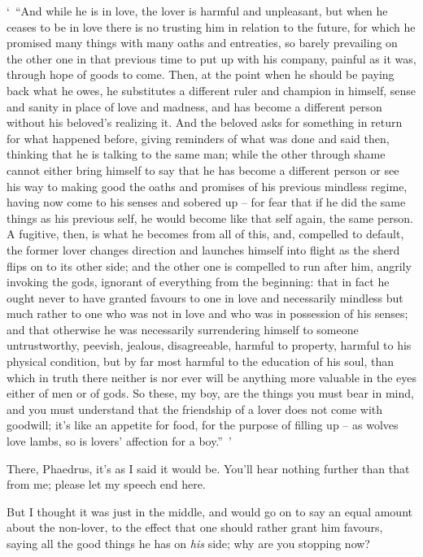 ‘~“And while he is in love, the lover is harmful and unpleasant, but
when he ceases to be in love there is no trusting him in relation to the
future, for which he promised many things with  many oaths and
entreaties, so barely prevailing on the other  one in that
previous time to put up with his company, painful as it was, through
hope of goods to come. Then, at the point when he should be paying back
what he owes, he substitutes a different ruler and champion in himself,
sense and sanity in place of love and madness, and has become a
different person without his beloved's realizing it. And the beloved
asks for  something in return for what happened
before, giving reminders
of what was done and said then, thinking that he is talking to the same
man; while the other through shame cannot either bring himself to say
that he has become a different person or see his way to making good the
oaths and promises of his previous mindless regime, having now come to
his senses and  sobered
up -- for fear that if he
did the same things as his previous self, he would become like that self
again, the same person. A fugitive, then, is what he becomes from all of
this,  and, compelled to default, the former lover changes
direction and launches himself into flight as the sherd flips on to its
other side; and the other
one is compelled to run after him, angrily invoking the gods, ignorant
of everything from the beginning: that in fact he ought never to have
granted favours to one in  love and
necessarily mindless but
much rather to one who was not in love and who was in possession of his
senses; and that otherwise he was necessarily surrendering himself to
someone untrustworthy, peevish, jealous, disagreeable, harmful to
property, harmful to his physical condition, but by far most harmful
 to the education of his soul, than which in truth there neither
is nor ever will be anything more valuable in the eyes either of men or
of gods. So these, my boy, are the things you must bear in mind, and you
must understand that the friendship of a lover does not come with
goodwill; it's like an appetite for food, for  the purpose of
filling up -- as wolves love lambs, so is lovers' affection for a
boy.”~'

There, Phaedrus, it's as I said it would
be. You'll hear nothing
further than that from me; please let my speech end here.

But I thought it was just in the middle, and would  go
on to say an equal amount about the non-lover, to the effect that one
should rather grant him favours, saying all the good things he has on
{\em his} side; why are you stopping now?

